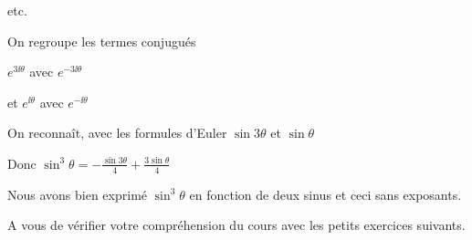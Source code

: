 etc.

\change

On regroupe les termes conjugués 

$e^{3 \ii  \theta}$ avec $e^{-3 \ii  \theta}$

et $e^{\ii  \theta}$ avec $e^{- \ii  \theta}$

\change

On reconnaît, avec les formules d'Euler
$\sin 3\theta$ et $\sin \theta$


Donc $\sin^3 \theta = - \frac{\sin 3 \theta}{4}
  + \frac{3 \sin \theta}{4}$


Nous avons bien exprimé $\sin^3 \theta$ en fonction de deux sinus
et ceci sans exposants.


\diapo

A vous de vérifier votre compréhension du cours avec les petits exercices
suivants.


